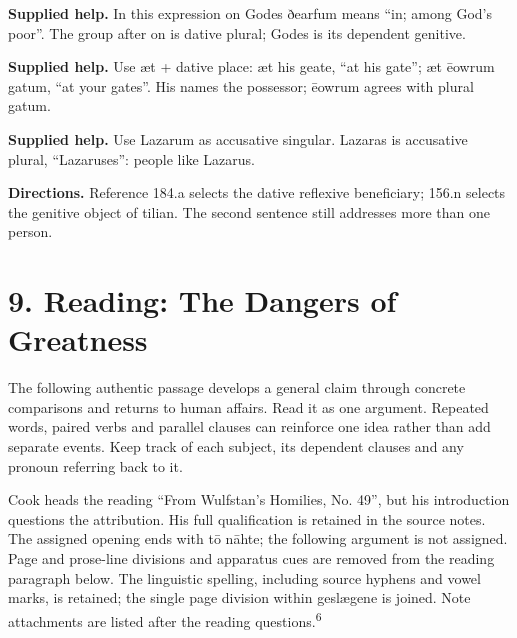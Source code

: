 \textbf{Supplied help.} In this expression on Godes ðearfum means “in; among God’s poor”. The group after on is dative plural; Godes is its dependent genitive.

\textbf{Supplied help.} Use æt + dative place: æt his geate, “at his gate”; æt ēowrum gatum, “at your gates”. His names the possessor; ēowrum agrees with plural gatum.

\textbf{Supplied help.} Use Lazarum as accusative singular. Lazaras is accusative plural, “Lazaruses”: people like Lazarus.

\textbf{Directions.} Reference 184.a selects the dative reflexive beneficiary; 156.n selects the genitive object of tilian. The second sentence still addresses more than one person.

\section*{9. Reading: The Dangers of Greatness}

The following authentic passage develops a general claim through concrete comparisons and returns to human affairs. Read it as one argument. Repeated words, paired verbs and parallel clauses can reinforce one idea rather than add separate events. Keep track of each subject, its dependent clauses and any pronoun referring back to it.

Cook heads the reading “From Wulfstan’s Homilies, No. 49”, but his introduction questions the attribution. His full qualification is retained in the source notes. The assigned opening ends with tō nāhte; the following argument is not assigned. Page and prose-line divisions and apparatus cues are removed from the reading paragraph below. The linguistic spelling, including source hyphens and vowel marks, is retained; the single page division within geslægene is joined. Note attachments are listed after the reading questions.\textsuperscript{6}

